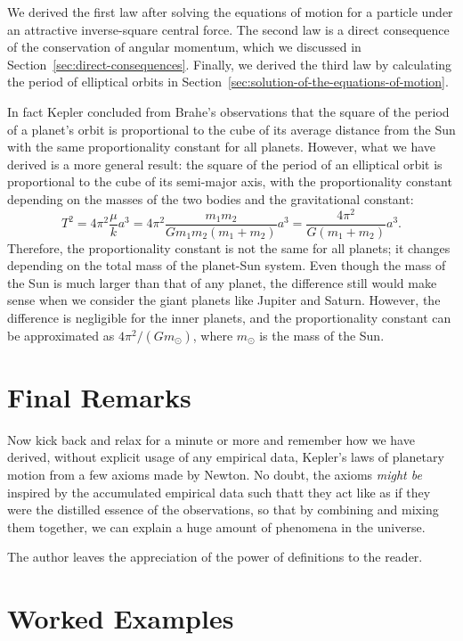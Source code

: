 \documentclass[12pt]{article}
\begin{document}
We derived the first law after solving the equations of motion for a particle under an attractive inverse-square central force. The second law is a direct consequence of the conservation of angular momentum, which we discussed in Section~\ref{sec:direct-consequences}. Finally, we derived the third law by calculating the period of elliptical orbits in Section~\ref{sec:solution-of-the-equations-of-motion}.

In fact Kepler concluded from Brahe's observations that the square of the period of a planet's orbit is proportional to the cube of its average distance from the Sun with the same proportionality constant for all planets. However, what we have derived is a more general result: the square of the period of an elliptical orbit is proportional to the cube of its semi-major axis, with the proportionality constant depending on the masses of the two bodies and the gravitational constant:
\[
    T^2 = 4\pi^2\frac{\mu}{k}a^3 = 4\pi^2\frac{m_1m_2}{Gm_1m_2(m_1+m_2)}a^3 = \frac{4\pi^2}{G(m_1+m_2)}a^3.
\]
Therefore, the proportionality constant is not the same for all planets; it changes depending on the total mass of the planet-Sun system. Even though the mass of the Sun is much larger than that of any planet, the difference still would make sense when we consider the giant planets like Jupiter and Saturn. However, the difference is negligible for the inner planets, and the proportionality constant can be approximated as \(4\pi^2/(Gm_\odot)\), where \(m_\odot\) is the mass of the Sun.

\section{Final Remarks}

Now kick back and relax for a minute or more and remember how we have derived, without explicit usage of any empirical data, Kepler's laws of planetary motion from a few axioms made by Newton. No doubt, the axioms \emph{might be} inspired by the accumulated empirical data such thatt they act like as if they were the distilled essence of the observations, so that by combining and mixing them together, we can explain a huge amount of phenomena in the universe.

The author leaves the appreciation of the power of definitions to the reader.






\section{Worked Examples}
\end{document}

